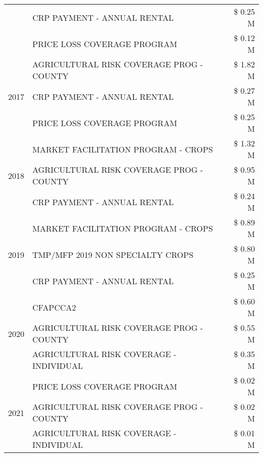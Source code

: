 \begin{tabular}{llr}
 & CRP PAYMENT - ANNUAL RENTAL                   & \$ 0.25 M \\
 & PRICE LOSS COVERAGE PROGRAM                   & \$ 0.12 M \\
\cline{1-3}
\multirow[t]{3}{*}{2017} & AGRICULTURAL RISK COVERAGE PROG - COUNTY & \$ 1.82 M \\
 & CRP PAYMENT - ANNUAL RENTAL & \$ 0.27 M \\
 & PRICE LOSS COVERAGE PROGRAM & \$ 0.25 M \\
\cline{1-3}
\multirow[t]{3}{*}{2018} & MARKET FACILITATION PROGRAM - CROPS & \$ 1.32 M \\
 & AGRICULTURAL RISK COVERAGE PROG - COUNTY & \$ 0.95 M \\
 & CRP PAYMENT - ANNUAL RENTAL & \$ 0.24 M \\
\cline{1-3}
\multirow[t]{3}{*}{2019} & MARKET FACILITATION PROGRAM - CROPS & \$ 0.89 M \\
 & TMP/MFP 2019 NON SPECIALTY CROPS & \$ 0.80 M \\
 & CRP PAYMENT - ANNUAL RENTAL & \$ 0.25 M \\
\cline{1-3}
\multirow[t]{3}{*}{2020} & CFAPCCA2 & \$ 0.60 M \\
 & AGRICULTURAL RISK COVERAGE PROG - COUNTY & \$ 0.55 M \\
 & AGRICULTURAL RISK COVERAGE - INDIVIDUAL & \$ 0.35 M \\
\cline{1-3}
\multirow[t]{3}{*}{2021} & PRICE LOSS COVERAGE PROGRAM & \$ 0.02 M \\
 & AGRICULTURAL RISK COVERAGE PROG - COUNTY & \$ 0.02 M \\
 & AGRICULTURAL RISK COVERAGE - INDIVIDUAL & \$ 0.01 M \\
\cline{1-3}
\bottomrule
\end{tabular}
